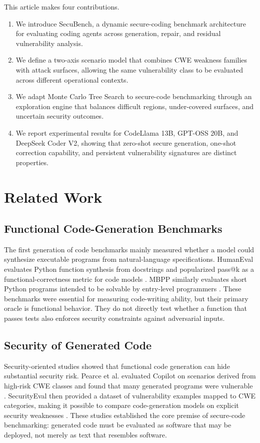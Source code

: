 \documentclass[11pt]{article}
\newcommand{\toolname}{SecuBench}
\begin{document}
This article makes four contributions.
\begin{enumerate}
\item We introduce \toolname{}, a dynamic secure-coding benchmark architecture for evaluating coding agents across generation, repair, and residual vulnerability analysis.
\item We define a two-axis scenario model that combines CWE weakness families with attack surfaces, allowing the same vulnerability class to be evaluated across different operational contexts.
\item We adapt Monte Carlo Tree Search to secure-code benchmarking through an exploration engine that balances difficult regions, under-covered surfaces, and uncertain security outcomes.
\item We report experimental results for CodeLlama 13B, GPT-OSS 20B, and DeepSeek Coder V2, showing that zero-shot secure generation, one-shot correction capability, and persistent vulnerability signatures are distinct properties.
\end{enumerate}


\section{Related Work}

\subsection{Functional Code-Generation Benchmarks}

The first generation of code benchmarks mainly measured whether a model could synthesize executable programs from natural-language specifications. HumanEval evaluates Python function synthesis from docstrings and popularized pass@k as a functional-correctness metric for code models \cite{chen2021codex}. MBPP similarly evaluates short Python programs intended to be solvable by entry-level programmers \cite{austin2021programsynthesis}. These benchmarks were essential for measuring code-writing ability, but their primary oracle is functional behavior. They do not directly test whether a function that passes tests also enforces security constraints against adversarial inputs.

\subsection{Security of Generated Code}

Security-oriented studies showed that functional code generation can hide substantial security risk. Pearce et al. evaluated Copilot on scenarios derived from high-risk CWE classes and found that many generated programs were vulnerable \cite{pearce2022asleep}. SecurityEval then provided a dataset of vulnerability examples mapped to CWE categories, making it possible to compare code-generation models on explicit security weaknesses \cite{siddiq2022securityeval}. These studies established the core premise of secure-code benchmarking: generated code must be evaluated as software that may be deployed, not merely as text that resembles software.
\end{document}
